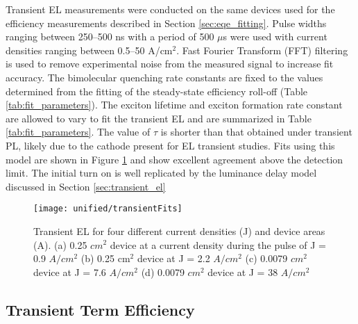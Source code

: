 \documentclass[../thesis.tex]{subfiles}
\begin{document}
Transient EL measurements were conducted on the same devices used for the efficiency measurements described in Section \ref{sec:eqe_fitting}. 
Pulse widths ranging between 250–500 ns with a period of 500 $\mu$s were used with current densities ranging between 0.5–50 A/cm$^2$. 
Fast Fourier Transform (FFT) filtering is used to remove experimental noise from the measured signal to increase fit accuracy. 
The bimolecular quenching rate constants are fixed to the values determined from the fitting of the steady-state efficiency roll-off (Table \ref{tab:fit_parameters}).
The exciton lifetime and exciton formation rate constant are allowed to vary to fit the transient EL and are summarized in Table \ref{tab:fit_parameters}.
The value of $\tau$ is shorter than that obtained under transient PL, likely due to the cathode present for EL transient studies.\supercite{Song2011}
Fits using this model are shown in Figure \ref{fig:transientFits} and show excellent agreement above the detection limit.  The initial turn on is well replicated by the luminance delay model discussed in Section \ref{sec:transient_el}


\begin{figure}[ht]
\centering
\texttt{[image: unified/transientFits]}
\caption{Transient EL for four different current densities (J) and device areas (A). (a) 0.25 $cm^2$ device at a current density during the pulse of J = 0.9 $A/cm^2$ (b) 0.25 cm$^2$
device at J = 2.2 $A/cm^2$ (c) 0.0079 $cm^2$ device at J = 7.6 $A/cm^2$ (d) 0.0079 $cm^2$ device at J = 38 $A/cm^2$}
\label{fig:transientFits}
\end{figure}


\subsection{Transient Term Efficiency}
\end{document}
